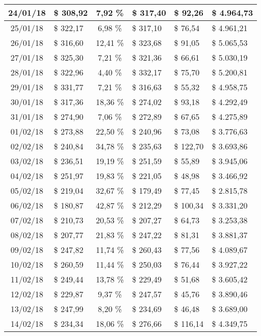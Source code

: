 \begin{center}
\begin{small}
\begin{longtable}{|c|l|c|l|l|l|}
24/01/18 & \$ 308,92 & 7,92 \% & \$ 317,40 & \$ 92,26 & \$ 4.964,73 \\ \hline
25/01/18 & \$ 322,17 & 6,98 \% & \$ 317,10 & \$ 76,54 & \$ 4.961,21 \\ \hline
26/01/18 & \$ 316,60 & 12,41 \% & \$ 323,68 & \$ 91,05 & \$ 5.065,53 \\ \hline
27/01/18 & \$ 325,30 & 7,21 \% & \$ 321,36 & \$ 66,61 & \$ 5.030,19 \\ \hline
28/01/18 & \$ 322,96 & 4,40 \% & \$ 332,17 & \$ 75,70 & \$ 5.200,81 \\ \hline
29/01/18 & \$ 331,77 & 7,21 \% & \$ 316,63 & \$ 55,32 & \$ 4.958,75 \\ \hline
30/01/18 & \$ 317,36 & 18,36 \% & \$ 274,02 & \$ 93,18 & \$ 4.292,49 \\ \hline
31/01/18 & \$ 274,90 & 7,06 \% & \$ 272,89 & \$ 67,65 & \$ 4.275,89 \\ \hline
01/02/18 & \$ 273,88 & 22,50 \% & \$ 240,96 & \$ 73,08 & \$ 3.776,63 \\ \hline
02/02/18 & \$ 240,84 & 34,78 \% & \$ 235,63 & \$ 122,70 & \$ 3.693,86 \\ \hline
03/02/18 & \$ 236,51 & 19,19 \% & \$ 251,59 & \$ 55,89 & \$ 3.945,06 \\ \hline
04/02/18 & \$ 251,97 & 19,83 \% & \$ 221,05 & \$ 48,98 & \$ 3.466,92 \\ \hline
05/02/18 & \$ 219,04 & 32,67 \% & \$ 179,49 & \$ 77,45 & \$ 2.815,78 \\ \hline
06/02/18 & \$ 180,87 & 42,87 \% & \$ 212,29 & \$ 100,34 & \$ 3.331,20 \\ \hline
07/02/18 & \$ 210,73 & 20,53 \% & \$ 207,27 & \$ 64,73 & \$ 3.253,38 \\ \hline
08/02/18 & \$ 207,77 & 21,83 \% & \$ 247,22 & \$ 81,31 & \$ 3.881,37 \\ \hline
09/02/18 & \$ 247,82 & 11,74 \% & \$ 260,43 & \$ 77,56 & \$ 4.089,67 \\ \hline
10/02/18 & \$ 260,59 & 11,44 \% & \$ 250,03 & \$ 76,44 & \$ 3.927,22 \\ \hline
11/02/18 & \$ 249,44 & 13,78 \% & \$ 229,49 & \$ 51,68 & \$ 3.605,42 \\ \hline
12/02/18 & \$ 229,87 & 9,37 \% & \$ 247,57 & \$ 45,76 & \$ 3.890,46 \\ \hline
13/02/18 & \$ 247,99 & 8,20 \% & \$ 234,69 & \$ 46,48 & \$ 3.689,00 \\ \hline
14/02/18 & \$ 234,34 & 18,06 \% & \$ 276,66 & \$ 116,14 & \$ 4.349,75 \\ \hline

\end{longtable}
\end{small}
\end{center}
